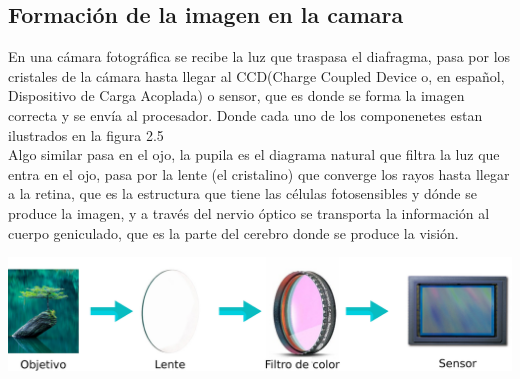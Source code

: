 \subsection{Formación de la imagen en la camara}
En una cámara fotográfica se recibe la luz que traspasa el diafragma, pasa por los
cristales de la cámara hasta llegar al CCD(Charge Coupled Device o, en español,
Dispositivo de Carga Acoplada) o sensor, que es donde se forma la imagen correcta y se
envía al procesador. Donde cada uno de los componenetes estan ilustrados en la figura 2.5\\
Algo similar pasa en el ojo, la pupila es el diagrama natural que filtra la luz que
entra en el ojo, pasa por la lente (el cristalino)  que converge los rayos hasta
llegar a la retina, que es la estructura que tiene las células fotosensibles y dónde
se produce la imagen, y a través del nervio óptico se transporta la información al
cuerpo geniculado, que es la parte del cerebro donde se produce la visión.
\begin{center}
	\includegraphics[width=1.0 \textwidth]{Contenido/Cuerpo/Capitulo2/Fig1_6.eps}
	\label{fig:MarcoTeorico:Fig5}
\end{center}

